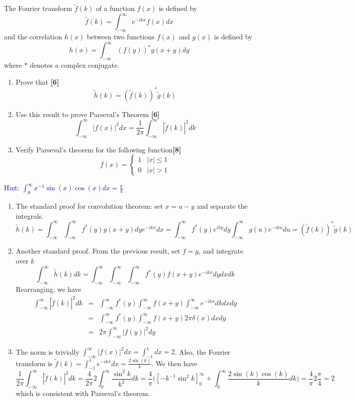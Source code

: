 \documentclass[a4paper]{article}
\begin{document}
\begin{qns}
The Fourier transform $\tilde{f}(k)$ of a function $f(x)$ is defined by
$$\tilde{f}(k)=\int_{-\infty}^\infty e^{-ikx}f(x)dx$$
and the correlation $h(x)$ between two functions $f(x)$ and $g(x)$ is defined by
$$h(x)=\int_{-\infty}^\infty(f(y))^*g(x+y)dy$$
where $*$ denotes a complex conjugate.
\begin{enumerate}[label=(\roman*)]
\item Prove that \hfill \textbf{[6]} $$\tilde{h}(k)=(\tilde{f}(k))^*\tilde{g}(k)$$
\item Use this result to prove Parseval's Theorem \hfill \textbf{[6]}
$$\int_{-\infty}^\infty|f(x)|^2dx=\frac{1}{2\pi}\int_{-\infty}^\infty|\tilde{f}(k)|^2dk$$
\item Verify Parseval's theorem for the following function\hfill \textbf{[8]}
$$f(x)=
\left\{
        \begin{array}{ll}
      1 & |x|\leq 1 \\
      0 & |x|>1
        \end{array}
    \right.$$
\end{enumerate}
\begin{mdframed}
\textcolor{darkblue}{Hint: $\int_0^\infty x^{-1}\sin(x)\cos(x)dx=\frac{\pi}{4}$}
\end{mdframed}
\end{qns}
\begin{ans}\leavevmode
\begin{enumerate}[label=(\roman*)]
\item The standard proof for convolution theorem: set $x=u-y$ and separate the integrals.
$$\tilde{h}(k)=\int_{-\infty}^\infty\int_{-\infty}^\infty f^*(y)g(x+y)dye^{-ikx}dx=\int_{-\infty}^\infty f^*(y)e^{iky}dy\int_{-\infty}^\infty g(u)e^{-iku}du=(\tilde{f}(k))^*\tilde{g}(k)$$
\item Another standard proof. From the previous result, set $f=g$, and integrate over $k$
$$\int_{-\infty}^\infty\tilde{h}(k)dk=\int_{-\infty}^\infty\int_{-\infty}^\infty\int_{-\infty}^\infty f^*(y)f(x+y)e^{-ikx}dydxdk$$
Rearranging, we have
\begin{eqnarray}
\int_{-\infty}^\infty|\tilde{f}(k)|^2dk&=&\int_{-\infty}^\infty f^*(y)\int_{-\infty}^\infty f(x+y)\int_{-\infty}^\infty e^{-ikx}dkdxdy\nonumber\\&=&\int_{-\infty}^\infty f^*(y)\int_{-\infty}^\infty f(x+y)2\pi\delta(x)dxdy\nonumber\\&=&2\pi\int_{-\infty}^\infty|f(y)|^2dy\nonumber
\end{eqnarray}
\item The norm is trivially $\int_{-\infty}^\infty|f(x)|^2dx=\int_{-1}^1dx=2$. Also, the Fourier transform is $\tilde{f}(k)=\int_{-1}^1e^{-ikx}dx=\frac{2\sin(k)}{k}$. We then have
$$\frac{1}{2\pi}\int_{-\infty}^\infty|\tilde{f}(k)|^2dk=\frac{4}{2\pi}2\int_0^\infty\frac{\sin^2k}{k^2}dk=\frac{4}{\pi}\bigg([-k^{-1}\sin^2k]^\infty_0+\int_0^\infty\frac{2\sin(k)\cos(k)}{k}dk\bigg)=\frac{4}{\pi}2\frac{\pi}{4}=2$$
which is consistent with Parseval's theorem.
\end{enumerate}
\end{ans}
\end{document}
